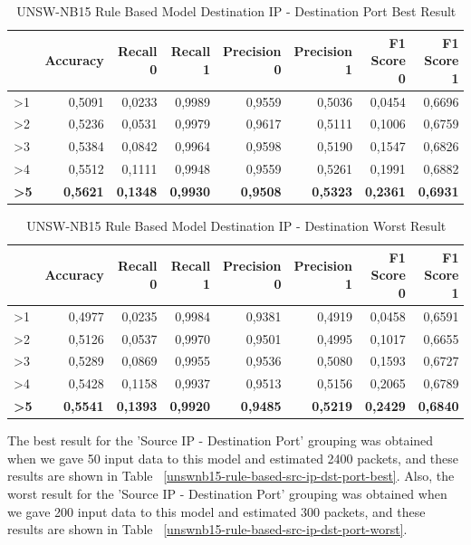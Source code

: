 \documentclass{article}
\begin{document}
\begin{table}
  \centering
  \caption{UNSW-NB15 Rule Based Model Destination IP - Destination Port Best Result}
  \label{unswnb15-rule-based-dst-ip-dst-port-best}
  \begin{tabular}{lrrrrrrr}
    \toprule
	{Rule & Accuracy & Recall 0 & Recall 1 & Precision 0 & Precision 1 & F1 Score 0 & F1 Score 1} \\
	\midrule
        >1 & 0,5091 & 0,0233 & 0,9989 & 0,9559 & 0,5036 & 0,0454 & 0,6696 \\ \hline
        >2 & 0,5236 & 0,0531 & 0,9979 & 0,9617 & 0,5111 & 0,1006 & 0,6759 \\ \hline
        >3 & 0,5384 & 0,0842 & 0,9964 & 0,9598 & 0,5190 & 0,1547 & 0,6826 \\ \hline
        >4 & 0,5512 & 0,1111 & 0,9948 & 0,9559 & 0,5261 & 0,1991 & 0,6882 \\ \hline
        \textbf{>5} & \textbf{0,5621} & \textbf{0,1348} & \textbf{0,9930} & \textbf{0,9508} & \textbf{0,5323} & \textbf{0,2361} & \textbf{0,6931} \\
	\bottomrule
  \end{tabular}
\end{table}

\begin{table}
  \centering
  \caption{UNSW-NB15 Rule Based Model Destination IP - Destination Worst Result}
  \label{unswnb15-rule-based-dst-ip-dst-port-worst}
  \begin{tabular}{lrrrrrrr}
    \toprule
	{Rule & Accuracy & Recall 0 & Recall 1 & Precision 0 & Precision 1 & F1 Score 0 & F1 Score 1} \\
	\midrule
        >1 & 0,4977 & 0,0235 & 0,9984 & 0,9381 & 0,4919 & 0,0458 & 0,6591 \\ \hline
        >2 & 0,5126 & 0,0537 & 0,9970 & 0,9501 & 0,4995 & 0,1017 & 0,6655 \\ \hline
        >3 & 0,5289 & 0,0869 & 0,9955 & 0,9536 & 0,5080 & 0,1593 & 0,6727 \\ \hline
        >4 & 0,5428 & 0,1158 & 0,9937 & 0,9513 & 0,5156 & 0,2065 & 0,6789 \\ \hline
        \textbf{>5} & \textbf{0,5541} & \textbf{0,1393} & \textbf{0,9920} & \textbf{0,9485} & \textbf{0,5219} & \textbf{0,2429} & \textbf{0,6840} \\ 
	\bottomrule
  \end{tabular}
\end{table}

The best result for the 'Source IP - Destination Port' grouping was obtained when we gave 50 input data to this model and estimated 2400 packets, and these results are shown in Table ~\ref{unswnb15-rule-based-src-ip-dst-port-best}. Also, the worst result for the 'Source IP - Destination Port' grouping was obtained when we gave 200 input data to this model and estimated 300 packets, and these results are shown in Table ~\ref{unswnb15-rule-based-src-ip-dst-port-worst}.
\end{document}

